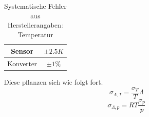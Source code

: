 \documentclass[12pt,a4paper]{article}
\begin{document}
\begin{table}[H]\centering
\caption{Systematische Fehler aus Herstellerangaben: Temperatur}
\begin{tabular}{|c|c|}
\hline 
Sensor & $\pm 2.5 K $ \\ 
\hline 
Konverter & $\pm 1\%$ \\ 
\hline 
\end{tabular}
\end{table}

Diese pflanzen sich wie folgt fort.
\begin{equation}
\sigma_{\Lambda,T} = \frac{\sigma_T}{T}\Lambda
\end{equation}
\begin{equation}
\sigma_{\Lambda,p} = RT\frac{\sigma_p}{p}
\end{equation}
\end{document}
